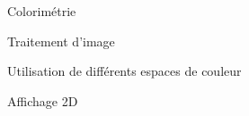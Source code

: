 \item[\textsc{\scriptsize [Phys]}] Colorimétrie
\item[\textsc{\scriptsize [Phys]}] Traitement d'image
\item[\textsc{\scriptsize [Phys]}] Utilisation de différents espaces de couleur
\item[\textsc{\scriptsize [Num]}] Affichage 2D